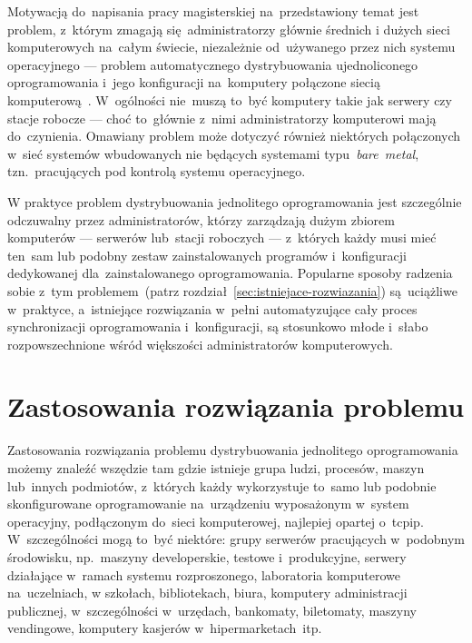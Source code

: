 \documentclass[thesis]{subfiles}
\begin{document}
Motywacją do~napisania pracy magisterskiej na~przedstawiony temat jest problem, z~którym zmagają się~administratorzy głównie średnich i dużych sieci komputerowych na~całym świecie, niezależnie od~używanego przez nich systemu operacyjnego --- problem automatycznego dystrybuowania ujednoliconego oprogramowania i~jego konfiguracji na~komputery połączone siecią komputerową~\cite{so-problem-intro}. W~ogólności nie~muszą to~być komputery takie jak serwery czy stacje robocze --- choć to~głównie z~nimi administratorzy komputerowi mają do~czynienia. Omawiany problem może dotyczyć również niektórych połączonych w~sieć systemów wbudowanych nie będących systemami typu~\mbox{\emph{bare~metal}}, tzn.~pracujących pod kontrolą systemu operacyjnego.

W praktyce problem dystrybuowania jednolitego oprogramowania jest szczególnie odczuwalny przez administratorów, którzy zarządzają dużym zbiorem komputerów --- serwerów lub~stacji roboczych --- z~których każdy musi mieć ten~sam lub podobny zestaw zainstalowanych programów i~konfiguracji dedykowanej dla~zainstalowanego oprogramowania. Popularne sposoby radzenia sobie z~tym problemem~(patrz rozdział~\ref{sec:istniejace-rozwiazania}) są~uciążliwe w~praktyce, a~istniejące rozwiązania w~pełni automatyzujące cały proces synchronizacji oprogramowania i~konfiguracji, są stosunkowo młode i~słabo rozpowszechnione wśród większości administratorów komputerowych.


\section{Zastosowania rozwiązania problemu}

Zastosowania rozwiązania problemu dystrybuowania jednolitego oprogramowania możemy znaleźć wszędzie tam gdzie istnieje grupa ludzi, procesów, maszyn lub~innych podmiotów, z~których każdy wykorzystuje to~samo lub podobnie skonfigurowane oprogramowanie na~urządzeniu wyposażonym w~system operacyjny, podłączonym do~sieci komputerowej, najlepiej opartej o~\gls{tcpip}. W~szczególności mogą to~być niektóre: grupy serwerów pracujących w~podobnym środowisku, np.~maszyny developerskie, testowe i~produkcyjne, serwery działające w~ramach systemu rozproszonego, laboratoria komputerowe na~uczelniach, w szkołach, bibliotekach, biura, komputery administracji publicznej, w~szczególności w~urzędach, bankomaty, biletomaty, maszyny vendingowe, komputery kasjerów w~hipermarketach~itp.
\end{document}
